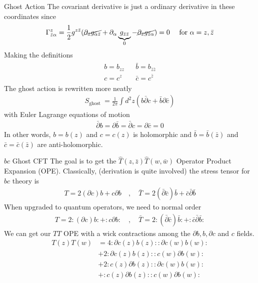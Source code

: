 \documentclass{beamer}
\begin{document}
\begin{frame}{Ghost Action}
    The covariant derivative is just a ordinary derivative in these coordinates since
    \begin{align}
        \Gamma_{\bar{z} \alpha}^z=\frac{1}{2} g^{z \bar{z}}( \cancel{\partial_{\bar{z}} g_{\alpha \bar{z}}}+\partial_\alpha \underbrace{g_{\bar{z} \bar{z}}}_0-\cancel{\partial_{\bar{z}} g_{\bar{z} \alpha}})=0 \quad \text { for } \alpha=z, \bar{z}
    \end{align}
    Making the definitions 
    \begin{align}
        \begin{array}{lll}
b=b_{z z} & & \bar{b}=b_{\bar{z} \bar{z}} \\
c=c^z & & \bar{c}=c^{\bar{z}}
\end{array}
    \end{align}
    The ghost action is rewritten more neatly
    \begin{align}
        S_{\text {ghost }}=\frac{1}{2 \pi} \int d^2 z(b \bar{\partial} c+\bar{b} \partial \bar{c})
    \end{align}
    with Euler Lagrange equations of motion
    \begin{align}
        \bar{\partial} b=\partial \bar{b}=\bar{\partial} c=\partial \bar{c}=0
    \end{align}
    In other words, $b=b(z)$ and $c=c(z)$ is holomorphic and $\bar{b} = \bar{b}(\bar{z})$ and $\bar{c} = \bar{c}(\bar{z})$ are anti-holomorphic.
\end{frame}
\begin{frame}{$bc$ Ghost CFT}
    The goal is to get the $\hat{T}(z,\bar z)\hat{T}(w,\bar w)$ Operator Product Expansion (OPE). Classically, (derivation is quite involved) the stress tensor for $bc$ theory is
    \begin{align}
        T=2(\partial c) b+c \partial b \quad, \quad \bar{T}=2(\bar{\partial} \bar{c}) \bar{b}+\bar{c} \bar{\partial} \bar{b}
    \end{align}
    When upgraded to quantum operators, we need to normal order 
    \begin{align}
        T=2:(\partial c) b:+:c \partial b: \quad, \quad \bar{T}=2:(\bar{\partial} \bar{c}) \bar{b}:+:\bar{c} \bar{\partial} \bar{b}:
    \end{align}
    We can get our $TT$ OPE with a wick contractions among the $\partial b, b, \partial c$ and $c$ fields.
    \begin{align}
T(z) T(w)&=4 : \partial c(z) b(z):: \partial c(w) b(w):\\&+2: \partial c(z) b(z):: c(w) \partial b(w): \\
& +2: c(z) \partial b(z):: \partial c(w) b(w):\\&+: c(z) \partial b(z):: c(w) \partial b(w):
    \end{align}
\end{frame}
\end{document}
